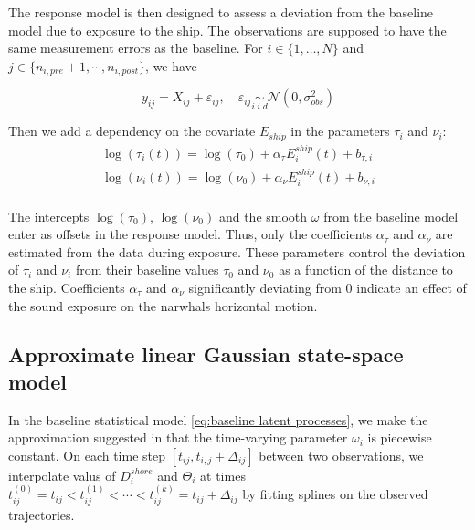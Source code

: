 \documentclass[aoas]{imsart}
\theoremstyle{definition}
\theoremstyle{remark}
\theoremstyle{remark}
\newcommand {\1}{\mathbb{1}}
\begin{document}
The response model is then designed to assess a deviation from the baseline model due to exposure to the ship. The observations are supposed to have the same measurement errors as the baseline. For $i \in \{1, \ldots, N\}$ and $j \in \{n_{i,pre}+1,\cdots,n_{i,post}\}$, we have

\begin{equation}  		y_{ij}=X_{ij}+\varepsilon_{ij}, \quad 		\varepsilon_{ij} \underset{i.i.d}{\sim} \mathcal{N}(0,\sigma_{obs}^2) 
	\label{eq: response observations}
\end{equation}

Then we add a dependency on the covariate $E_{ship}$ in the parameters $\tau_i$ and $\nu_i$: 
\begin{equation}    
	\begin{array}{l}
		\log(\tau_{i}(t))=\log(\tau_{0})+\alpha_{\tau} E^{ship}_i(t)+b_{\tau,i} \\
		\log(\nu_{i}(t))=\log(\nu_{0}) +  \alpha_{\nu} E^{ship}_i(t) +b_{\nu,i}  \\
	\end{array}
	\label{eq:response loglinear model}
\end{equation}


The intercepts $\log(\tau_0)$, $\log(\nu_0)$ and the smooth $\omega$ from the baseline model enter as offsets in the response model.
Thus, only the coefficients $\alpha_{\tau}$ and $\alpha_{\nu}$ are estimated from the data during exposure. These parameters control the deviation of $\tau_i$ and $\nu_i$ from their baseline values $\tau_0$ and $\nu_0$ as a function of the distance to the ship. Coefficients $\alpha_{\tau}$ and $\alpha_{\nu}$ significantly deviating from $0$ indicate an effect of the sound exposure on the narwhals horizontal motion.




\subsection{Approximate linear Gaussian state-space model}
\label{section: state space model}

In the baseline statistical model \eqref{eq:baseline latent processes}, we make the approximation suggested in \citep{michelot_varying-coefficient_2021} that the time-varying parameter $\omega_i$ is piecewise constant.
On each time step $[t_{ij},t_{i,j}+\Delta_{ij}]$ between two observations, we interpolate valus of $D^{shore}_i$ and $\Theta_i$ at times $t_{ij}^{(0)} = t_{ij} < t_{ij}^{(1)} < \cdots < t_{ij}^{(k)}=t_{ij}+\Delta_{ij}$ by fitting splines on the observed trajectories.
\end{document}
